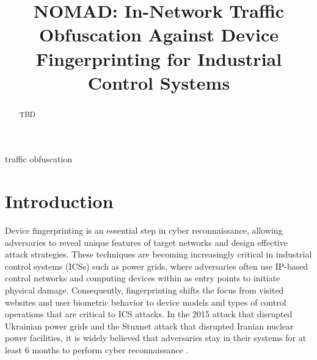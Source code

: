 \documentclass[conference]{IEEEtran}
\begin{document}
\title{
NOMAD: In-Network Traffic Obfuscation Against Device Fingerprinting for Industrial Control Systems
% 
}

\author{
\and
{}
}
\vspace{0pt}
\maketitle

\begin{abstract}
TBD
\end{abstract}

\begin{IEEEkeywords}
traffic obfuscation
\end{IEEEkeywords}

\section{Introduction}

Device fingerprinting is an essential step in cyber reconnaissance, allowing adversaries to reveal unique features of target networks and design effective attack strategies. These techniques are becoming increasingly critical in industrial control systems (ICSs) such as power grids, where adversaries often use IP-based control networks and computing devices within as entry points to initiate physical damage. Consequently, fingerprinting shifts the focus from visited websites and user biometric behavior to device models and types of control operations that are critical to ICS attacks. In the 2015 attack that disrupted Ukrainian power grids and the Stuxnet attack that disrupted Iranian nuclear power facilities, it is widely believed that adversaries stay in their systems for at least 6 months to perform cyber reconnaissance \cite{ukraine2015, stuxnet2011}. 
\end{document}
